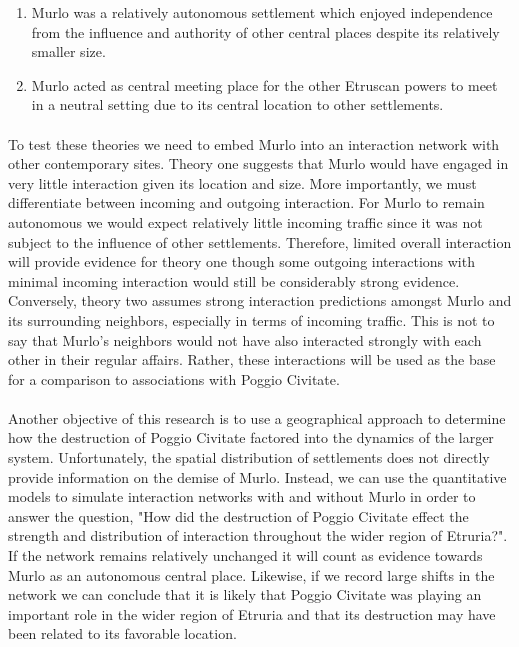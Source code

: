 \documentclass[12pt,a4paper]{thesis}
\begin{document}
	\begin{enumerate}
	\item Murlo was a relatively autonomous settlement which enjoyed independence from the influence and authority of other central places despite its relatively smaller size.
	\item Murlo acted as central meeting place for the other Etruscan powers to meet in a neutral setting due to its central location to other settlements. 
	\end{enumerate}

\paragraph{}
To test these theories we need to embed Murlo into an interaction network with other contemporary sites. Theory one suggests that Murlo would have engaged in very little interaction given its location and size. More importantly, we must differentiate between incoming and outgoing interaction. For Murlo to remain autonomous we would expect relatively little incoming traffic since it was not subject to the influence of other settlements. Therefore, limited overall interaction will provide evidence for theory one though some outgoing interactions with minimal incoming interaction would still be considerably strong evidence. Conversely, theory two assumes strong interaction predictions amongst Murlo and its surrounding neighbors, especially in terms of incoming traffic. This is not to say that Murlo's neighbors would not have also interacted strongly with each other in their regular affairs. Rather, these interactions will be used as the base for a comparison to associations with Poggio Civitate.

\paragraph{}
Another objective of this research is to use a geographical approach to determine how the destruction of Poggio Civitate factored into the dynamics of the larger system. Unfortunately, the spatial distribution of settlements does not directly provide information on the demise of Murlo. Instead, we can use the quantitative models to simulate interaction networks with and without Murlo in order to answer the question, "How did the destruction of Poggio Civitate effect the strength and distribution of interaction throughout the wider region of Etruria?". If the network remains relatively unchanged it will count as evidence towards Murlo as an autonomous central place. Likewise, if we record large shifts in the network we can conclude that it is likely that Poggio Civitate was playing an important role in the wider region of Etruria and that its destruction may have been related to its favorable location. 
\end{document}
